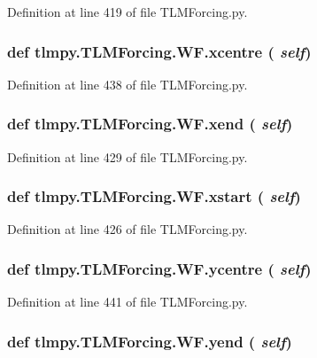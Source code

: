 Definition at line 419 of file TLMForcing.py.\hypertarget{classtlmpy_1_1TLMForcing_1_1WF_aeab637f60512c6a3f3343896e09790b0}{
\subsubsection[{xcentre}]{\setlength{\rightskip}{0pt plus 5cm}def tlmpy.TLMForcing.WF.xcentre ( {\em self})}}
\label{classtlmpy_1_1TLMForcing_1_1WF_aeab637f60512c6a3f3343896e09790b0}


Definition at line 438 of file TLMForcing.py.\hypertarget{classtlmpy_1_1TLMForcing_1_1WF_ade8a3c331235286ffd9642428997a110}{
\subsubsection[{xend}]{\setlength{\rightskip}{0pt plus 5cm}def tlmpy.TLMForcing.WF.xend ( {\em self})}}
\label{classtlmpy_1_1TLMForcing_1_1WF_ade8a3c331235286ffd9642428997a110}


Definition at line 429 of file TLMForcing.py.\hypertarget{classtlmpy_1_1TLMForcing_1_1WF_a62c10f4c2b5072b95dada14dec8fa8ad}{
\subsubsection[{xstart}]{\setlength{\rightskip}{0pt plus 5cm}def tlmpy.TLMForcing.WF.xstart ( {\em self})}}
\label{classtlmpy_1_1TLMForcing_1_1WF_a62c10f4c2b5072b95dada14dec8fa8ad}


Definition at line 426 of file TLMForcing.py.\hypertarget{classtlmpy_1_1TLMForcing_1_1WF_aa669d1fa2a8fae06f5cb698ad30a9015}{
\subsubsection[{ycentre}]{\setlength{\rightskip}{0pt plus 5cm}def tlmpy.TLMForcing.WF.ycentre ( {\em self})}}
\label{classtlmpy_1_1TLMForcing_1_1WF_aa669d1fa2a8fae06f5cb698ad30a9015}


Definition at line 441 of file TLMForcing.py.\hypertarget{classtlmpy_1_1TLMForcing_1_1WF_a317f0e822dd3b3cfa231aa31c1aa41e6}{
\subsubsection[{yend}]{\setlength{\rightskip}{0pt plus 5cm}def tlmpy.TLMForcing.WF.yend ( {\em self})}}
\label{classtlmpy_1_1TLMForcing_1_1WF_a317f0e822dd3b3cfa231aa31c1aa41e6}



